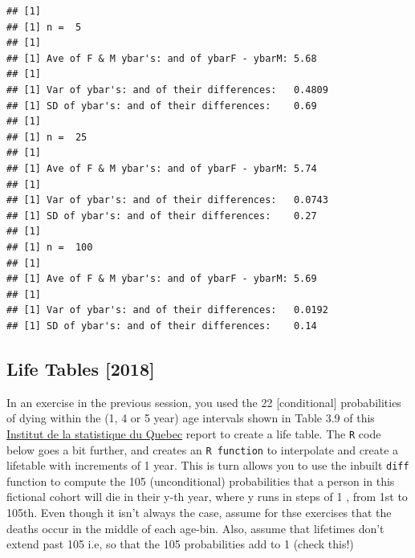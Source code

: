 \documentclass[]{book}
\begin{document}
\begin{verbatim}
## [1] 
## [1] n =  5
## [1] 
## [1] Ave of F & M ybar's: and of ybarF - ybarM: 5.68
## [1] 
## [1] Var of ybar's: and of their differences:   0.4809
## [1] SD of ybar's: and of their differences:    0.69
## [1] 
## [1] n =  25
## [1] 
## [1] Ave of F & M ybar's: and of ybarF - ybarM: 5.74
## [1] 
## [1] Var of ybar's: and of their differences:   0.0743
## [1] SD of ybar's: and of their differences:    0.27
## [1] 
## [1] n =  100
## [1] 
## [1] Ave of F & M ybar's: and of ybarF - ybarM: 5.69
## [1] 
## [1] Var of ybar's: and of their differences:   0.0192
## [1] SD of ybar's: and of their differences:    0.14
\end{verbatim}

\hypertarget{life-tables-2018-1}{%
\subsection{Life Tables {[}2018{]}}\label{life-tables-2018-1}}

In an exercise in the previous session, you used the 22 {[}conditional{]} probabilities of dying within the (1, 4 or 5 year) age intervals shown in Table 3.9 of this \href{https://www.stat.gouv.qc.ca/statistiques/population-demographie/bilan2019.pdf\#page=55}{Institut de la statistique du Quebec} report to create a life table. The \texttt{R} code below goes a bit further, and creates an \texttt{R\ function} to interpolate and create a lifetable with increments of 1 year. This is turn allows you to use the inbuilt \texttt{diff} function to compute the 105 (unconditional) probabilities that a person in this fictional cohort will die in their y-th year, where y runs in steps of 1 , from 1st to 105th. Even though it isn't always the case, assume for thse exercises that the deaths occur in the middle of each age-bin. Also, assume that lifetimes don't extend past 105 i.e, so that the 105 probabilities add to 1 (check this!)
\end{document}
